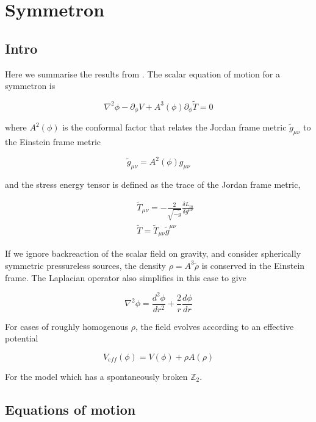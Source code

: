 \documentclass[aps,showpacs,onecolumn,floats,prd,superscriptaddress,nofootinbib]{revtex4-1}
\begin{document}
\section{Symmetron}
\subsection{Intro}
Here we summarise the results from \cite{Hinterbichler:2010es,Clampitt:2011mx}.
The scalar equation of motion for a symmetron is 

\begin{equation}
	\nabla^2 \phi -\partial_\phi V + A^3(\phi)\partial_\phi \tilde{T} = 0
\end{equation}

where $A^2(\phi)$ is the conformal factor that relates the Jordan frame metric $\tilde{g}_{\mu\nu}$ to the Einstein frame metric

\begin{equation}
	\tilde{g}_{\mu \nu}=A^2(\phi)g_{\mu \nu}
\end{equation}

and the stress energy tensor is defined as the trace of the Jordan frame metric, 

\begin{eqnarray}
	& & \tilde{T}_{\mu \nu} =- \frac{2}{\sqrt{-\tilde{g}}} \frac{\delta L_m}{\delta g^{\mu \nu}}	\nonumber	\\
	& & \tilde{T} = \tilde{T}_{\mu \nu} \tilde{g}^{\mu \nu}
\end{eqnarray}

If we ignore backreaction of the scalar field on gravity, and consider spherically symmetric pressureless sources, the density $\rho = A^3\tilde{\rho}$ is conserved in the Einstein frame. The Laplacian operator also simplifies in this case to give 

\begin{equation}
	\nabla^2 \phi = \frac{d^2 \phi}{dr^2} + \frac{2}{r} \frac{d \phi}{dr}
\end{equation}

For cases of roughly homogenous $\rho$, the field evolves according to an effective potential 

\begin{equation}
	V_{eff}(\phi) = V(\phi) + \rho A(\rho)
\end{equation}

For the model which has a spontaneously broken $\mathbb{Z}_2$.

\subsection{Equations of motion}
\end{document}
